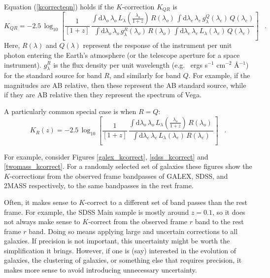 \documentclass[10pt,preprint]{aastex}
\newcommand{\lambdaobs}{\lambda_o}
\newcommand{\lambdaemit}{\lambda_e}
\begin{document}
Equation (\ref{kcorrecteqn}) holds if the $K$-correction $K_{QR}$ is
\begin{equation}
\label{eq:wavelengthL}
K_{QR} = -2.5\,\log_{10}\left[\frac{1}{[1+z]}\,
  \frac{\displaystyle
  \int\mathrm{d}\lambdaobs\,\lambdaobs\,L_{\lambda}\!\left(\frac{\lambdaobs}{1+z}\right)\,R(\lambdaobs)\,
    \int\mathrm{d}\lambdaemit\,\lambdaemit\,
    g^Q_{\lambda}(\lambdaemit)\,Q(\lambdaemit)}
       {\displaystyle
  \int\mathrm{d}\lambdaobs\,\lambdaobs\,g^R_{\lambda}(\lambdaobs)\,R(\lambdaobs)\,
    \int\mathrm{d}\lambdaemit\,\lambdaemit\,
    L_{\lambda}(\lambdaemit)\,Q(\lambdaemit)}
\right] \;\;\;.
\end{equation}
Here, $R(\lambda)$ and $Q(\lambda)$ represent the response of the
instrument per unit photon entering the Earth's atmosphere (or the
telescope aperture for a space instrument).  $g^R_\lambda$ is the flux
density per unit wavelength (e.g.~ ergs s$^{-1}$ cm$^{-2}$ \AA$^{-1}$)
for the standard source for band $R$, and similarly for band $Q$. For
example, if the magnitudes are AB relative, then these represent the
AB standard source, while if they are AB relative then they represent
the spectrum of Vega. 

A particularly common special case is when $R=Q$:
\begin{equation}
\label{eq:specialL}
K_R(z) = -2.5\,\log_{10}\left[\frac{1}{[1+z]}\,
  \frac{\displaystyle
  \int\mathrm{d}\lambdaobs\,\lambdaobs\,L_{\lambda}\!\left(\frac{\lambdaobs}{1+z}\right)\,R(\lambdaobs)\,}
       {\displaystyle
    \int\mathrm{d}\lambdaemit\,\lambdaemit\,
    L_{\lambda}(\lambdaemit)\,R(\lambdaemit)}
\right] \;\;\;.
\end{equation}

For example, consider Figures \ref{galex_kcorrect},
\ref{sdss_kcorrect} and \ref{twomass_kcorrect}. For a randomly
selected set of galaxies these figures show the $K$-corrections from
the observed frame bandpasses of GALEX, SDSS, and 2MASS respectively,
to the same bandpasses in the rest frame.

Often, it makes sense to $K$-correct to a different set of band passes
than the rest frame. For example, the SDSS Main sample is mostly
around $z=0.1$, so it does not always make sense to $K$-correct from
the observed frame $r$ band to the rest frame $r$ band. Doing so means
applying large and uncertain corrections to all galaxies. If precision
is not important, this uncertainty might be worth the simplification
it brings. However, if one is (say) interested in the evolution of
galaxies, the clustering of galaxies, or something else that requires
precision, it makes more sense to avoid introducing unnecessary
uncertainty.
\end{document}
